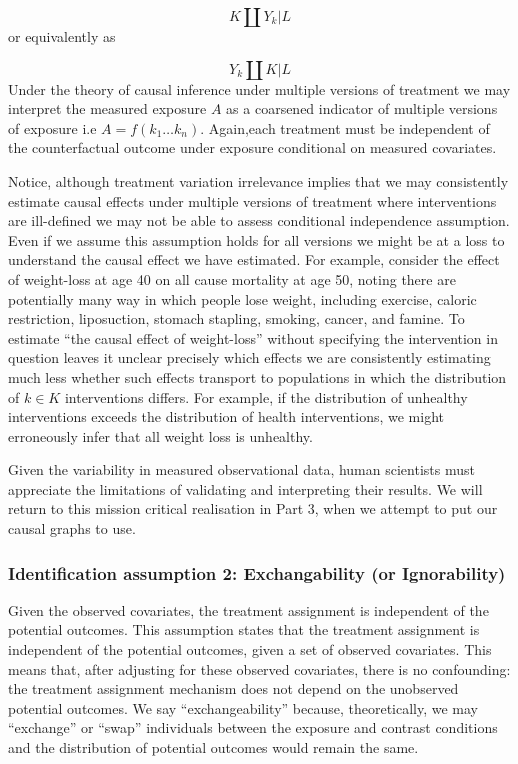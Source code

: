 \documentclass[
  singlecolumn]{report}
\begin{document}
\[K \coprod Y_k | L\] or equivalently as

\[Y_k \coprod K | L\] Under the theory of causal inference under
multiple versions of treatment we may interpret the measured exposure
\(A\) as a coarsened indicator of multiple versions of exposure i.e
\(A = f(k_1\dots k_n)\). Again,each treatment must be independent of the
counterfactual outcome under exposure conditional on measured
covariates.

Notice, although treatment variation irrelevance implies that we may
consistently estimate causal effects under multiple versions of
treatment where interventions are ill-defined we may not be able to
assess conditional independence assumption. Even if we assume this
assumption holds for all versions we might be at a loss to understand
the causal effect we have estimated. For example, consider the effect of
weight-loss at age 40 on all cause mortality at age 50, noting there are
potentially many way in which people lose weight, including exercise,
caloric restriction, liposuction, stomach stapling, smoking, cancer, and
famine. To estimate ``the causal effect of weight-loss'' without
specifying the intervention in question leaves it unclear precisely
which effects we are consistently estimating much less whether such
effects transport to populations in which the distribution of
\(k \in K\) interventions differs. For example, if the distribution of
unhealthy interventions exceeds the distribution of health
interventions, we might erroneously infer that all weight loss is
unhealthy.

Given the variability in measured observational data, human scientists
must appreciate the limitations of validating and interpreting their
results. We will return to this mission critical realisation in Part 3,
when we attempt to put our causal graphs to use.

\hypertarget{identification-assumption-2-exchangability-or-ignorability}{%
\subsubsection{Identification assumption 2: Exchangability (or
Ignorability)}\label{identification-assumption-2-exchangability-or-ignorability}}

Given the observed covariates, the treatment assignment is independent
of the potential outcomes. This assumption states that the treatment
assignment is independent of the potential outcomes, given a set of
observed covariates. This means that, after adjusting for these observed
covariates, there is no confounding: the treatment assignment mechanism
does not depend on the unobserved potential outcomes. We say
``exchangeability'' because, theoretically, we may ``exchange'' or
``swap'' individuals between the exposure and contrast conditions and
the distribution of potential outcomes would remain the same.
\end{document}
